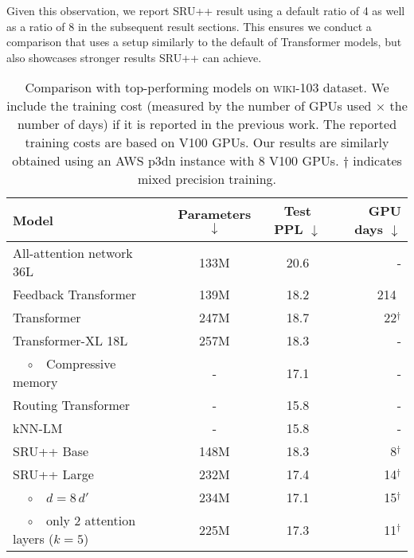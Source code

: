 Given this observation, we report SRU++ result using a default ratio of 4 as well as a ratio of 8 in the subsequent result sections.
This ensures we conduct a comparison that uses a setup similarly to the default of Transformer models, but also showcases stronger results SRU++ can achieve.


\begin{table*}[!t!]
    \centering
    \begin{tabular}{lccr}
    \toprule
    \bf Model & \bf Parameters $\downarrow$ & \bf Test PPL $\downarrow$ & \bf GPU days $\downarrow$\\
    \hline
    All-attention network 36L~\cite{sukhbaatar2019augmenting} & 133M & 20.6 & -\\
    Feedback Transformer~\cite{fan2020accessing} & 139M & 18.2 & 214$\ \,$\\
    Transformer~\cite{baevski2018adaptive} & 247M & 18.7 & 22$^\dagger$\\
    Transformer-XL 18L~\cite{dai-etal-2019-transformer} & 257M & 18.3 & - \\
    $\quad\circ$ $\ $ Compressive memory~\cite{Rae2020Compressive} & - & 17.1 & -\\
    Routing Transformer~\cite{roy2020efficient} & - & 15.8 & -\\
    kNN-LM~\cite{Khandelwal2020Generalization} & - & 15.8 & -\\
    \hline
    SRU++ Base & 148M & 18.3 & 8$^\dagger$ \\
\hdashline
    SRU++ Large & 232M & 17.4 & 14$^\dagger$ \\
    $\quad\circ$ $\ $ $d=8\,d'$ & 234M & 17.1 & 15$^\dagger$\\   
    $\quad\circ$ $\ $ only 2 attention layers ($k=5$) & 225M & 17.3 & 11$^\dagger$\\   
\bottomrule
    \end{tabular}
    \caption{Comparison with top-performing models on \textsc{wiki-103} dataset. We include the training cost (measured by the number of GPUs used $\times$ the number of days) if it is reported in the previous work. The reported training costs are based on V100 GPUs. Our results are similarly obtained using an AWS p3dn instance with 8 V100 GPUs. $\dagger$ indicates mixed precision training.}
    \label{tab:wit103_sota}
\end{table*}
